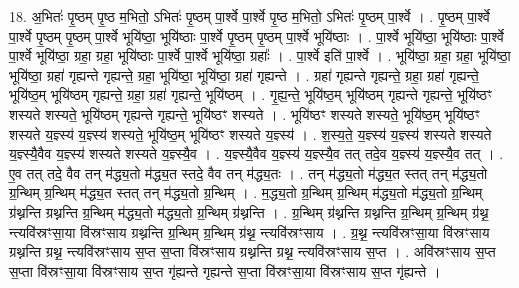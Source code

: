 \documentclass[17pt]{extarticle}
\begin{document}
18. अ॒भितः॑ पृ॒ष्ठम् पृ॒ष्ठ म॒भितो॒ ऽभितः॑ पृ॒ष्ठम् पा॒र्श्वे पा॒र्श्वे पृ॒ष्ठ म॒भितो॒ ऽभितः॑ पृ॒ष्ठम् पा॒र्श्वे । . पृ॒ष्ठम् पा॒र्श्वे पा॒र्श्वे पृ॒ष्ठम् पृ॒ष्ठम् पा॒र्श्वे भूयि॑ष्ठा॒ भूयि॑ष्ठाः पा॒र्श्वे पृ॒ष्ठम् पृ॒ष्ठम् पा॒र्श्वे भूयि॑ष्ठाः । . पा॒र्श्वे भूयि॑ष्ठा॒ भूयि॑ष्ठाः पा॒र्श्वे पा॒र्श्वे भूयि॑ष्ठा॒ ग्रहा॒ ग्रहा॒ भूयि॑ष्ठाः पा॒र्श्वे पा॒र्श्वे भूयि॑ष्ठा॒ ग्रहाः᳚ । . पा॒र्श्वे इति॑ पा॒र्श्वे । . भूयि॑ष्ठा॒ ग्रहा॒ ग्रहा॒ भूयि॑ष्ठा॒ भूयि॑ष्ठा॒ ग्रहा॑ गृह्यन्ते गृह्यन्ते॒ ग्रहा॒ भूयि॑ष्ठा॒ भूयि॑ष्ठा॒ ग्रहा॑ गृह्यन्ते । . ग्रहा॑ गृह्यन्ते गृह्यन्ते॒ ग्रहा॒ ग्रहा॑ गृह्यन्ते॒ भूयि॑ष्ठ॒म् भूयि॑ष्ठम् गृह्यन्ते॒ ग्रहा॒ ग्रहा॑ गृह्यन्ते॒ भूयि॑ष्ठम् । . गृ॒ह्य॒न्ते॒ भूयि॑ष्ठ॒म् भूयि॑ष्ठम् गृह्यन्ते गृह्यन्ते॒ भूयि॑ष्ठꣳ शस्यते शस्यते॒ भूयि॑ष्ठम् गृह्यन्ते गृह्यन्ते॒ भूयि॑ष्ठꣳ शस्यते । . भूयि॑ष्ठꣳ शस्यते शस्यते॒ भूयि॑ष्ठ॒म् भूयि॑ष्ठꣳ शस्यते य॒ज्ञ्स्य॑ य॒ज्ञ्स्य॑ शस्यते॒ भूयि॑ष्ठ॒म् भूयि॑ष्ठꣳ शस्यते य॒ज्ञ्स्य॑ । . श॒स्य॒ते॒ य॒ज्ञ्स्य॑ य॒ज्ञ्स्य॑ शस्यते शस्यते य॒ज्ञ्स्यै॒वैव य॒ज्ञ्स्य॑ शस्यते शस्यते य॒ज्ञ्स्यै॒व । . य॒ज्ञ्स्यै॒वैव य॒ज्ञ्स्य॑ य॒ज्ञ्स्यै॒व तत् तदे॒व य॒ज्ञ्स्य॑ य॒ज्ञ्स्यै॒व तत् । . ए॒व तत् तदे॒ वैव तन् म॑द्ध्य॒तो म॑द्ध्य॒त स्तदे॒ वैव तन् म॑द्ध्य॒तः । . तन् म॑द्ध्य॒तो म॑द्ध्य॒त स्तत् तन् म॑द्ध्य॒तो ग्र॒न्थिम् ग्र॒न्थिम् म॑द्ध्य॒त स्तत् तन् म॑द्ध्य॒तो ग्र॒न्थिम् । . म॒द्ध्य॒तो ग्र॒न्थिम् ग्र॒न्थिम् म॑द्ध्य॒तो म॑द्ध्य॒तो ग्र॒न्थिम् ग्र॑थ्नन्ति ग्रथ्नन्ति ग्र॒न्थिम् म॑द्ध्य॒तो म॑द्ध्य॒तो ग्र॒न्थिम् ग्र॑थ्नन्ति । . ग्र॒न्थिम् ग्र॑थ्नन्ति ग्रथ्नन्ति ग्र॒न्थिम् ग्र॒न्थिम् ग्र॑थ्न॒ न्त्यवि॑स्रꣳसा॒या वि॑स्रꣳसाय ग्रथ्नन्ति ग्र॒न्थिम् ग्र॒न्थिम् ग्र॑थ्न॒ न्त्यवि॑स्रꣳसाय । . ग्र॒थ्न॒ न्त्यवि॑स्रꣳसा॒या वि॑स्रꣳसाय ग्रथ्नन्ति ग्रथ्न॒ न्त्यवि॑स्रꣳसाय स॒प्त स॒प्ता वि॑स्रꣳसाय ग्रथ्नन्ति ग्रथ्न॒ न्त्यवि॑स्रꣳसाय स॒प्त । . अवि॑स्रꣳसाय स॒प्त स॒प्ता वि॑स्रꣳसा॒या वि॑स्रꣳसाय स॒प्त गृ॑ह्यन्ते गृह्यन्ते स॒प्ता वि॑स्रꣳसा॒या वि॑स्रꣳसाय स॒प्त गृ॑ह्यन्ते । \newline
\end{document}
